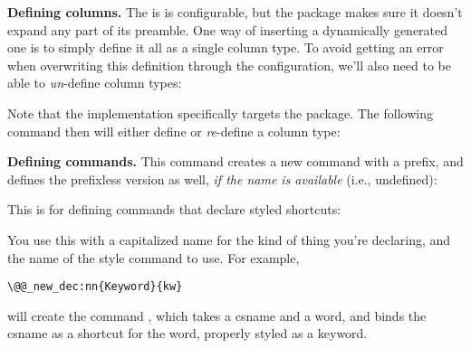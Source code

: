 \documentclass[a4paper]{article}
\def\paragraph#1{\noindent\textbf{#1}\enskip}
\def\refk{\refKey*}
\begin{document}
\paragraph{Defining columns.} The \refk{preamble} is is configurable, but the
 package makes sure it doesn't expand
any part of its preamble. One way of inserting a dynamically generated one is
to simply define it all as a single column type. To avoid getting an error
when overwriting this definition through the configuration, we'll also need to
be able to \emph{un}-define column types:
Note that the implementation specifically targets the
 package. The following command then
will either define or \emph{re}-define a column type:
%
\paragraph{Defining commands.}
This command creates a new command with a  prefix, and defines
the prefixless version as well, \emph{if the name is available} (i.e.,
undefined):
This is for defining commands that declare styled shortcuts:
You use this with a capitalized name for the kind of thing you're declaring,
and the name of the style command to use. For example,
\begin{center}
\verb|\@@_new_dec:nn{Keyword}{kw}|
\end{center}
will create the command , which takes a csname and a
word, and binds the csname as a shortcut for the word, properly styled as a
keyword.
\end{document}
